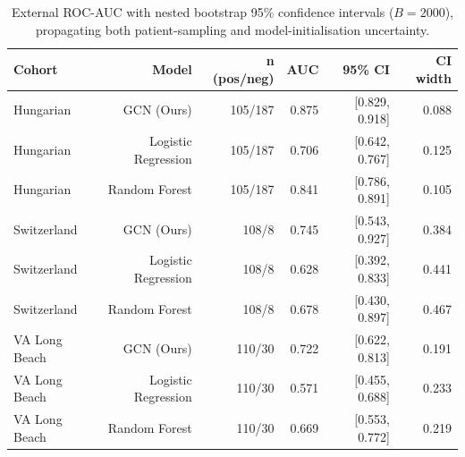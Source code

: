 \begin{table}[t]
\centering
\caption{External ROC-AUC with nested bootstrap 95\% confidence intervals ($B=2000$), propagating both patient-sampling and model-initialisation uncertainty.}
\label{tab:extboot}
\footnotesize
\begin{tabular}{lrrrrr}
\toprule
Cohort & Model & n (pos/neg) & AUC & 95\% CI & CI width \\
\midrule
Hungarian & GCN (Ours) & 105/187 & 0.875 & [0.829, 0.918] & 0.088 \\
Hungarian & Logistic Regression & 105/187 & 0.706 & [0.642, 0.767] & 0.125 \\
Hungarian & Random Forest & 105/187 & 0.841 & [0.786, 0.891] & 0.105 \\
Switzerland & GCN (Ours) & 108/8 & 0.745 & [0.543, 0.927] & 0.384 \\
Switzerland & Logistic Regression & 108/8 & 0.628 & [0.392, 0.833] & 0.441 \\
Switzerland & Random Forest & 108/8 & 0.678 & [0.430, 0.897] & 0.467 \\
VA Long Beach & GCN (Ours) & 110/30 & 0.722 & [0.622, 0.813] & 0.191 \\
VA Long Beach & Logistic Regression & 110/30 & 0.571 & [0.455, 0.688] & 0.233 \\
VA Long Beach & Random Forest & 110/30 & 0.669 & [0.553, 0.772] & 0.219 \\
\bottomrule
\end{tabular}
\end{table}
